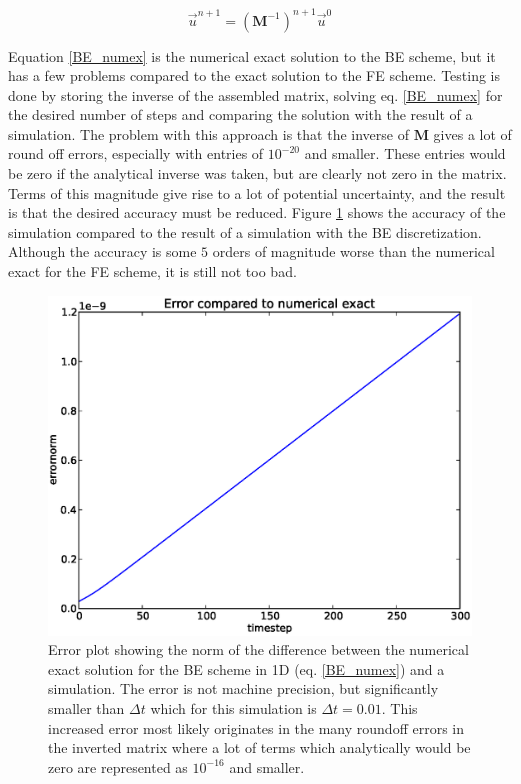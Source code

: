 \begin{equation}\label{BE_numex}
 \vec u^{n+1} = \left(\mathbf M^{-1}\right)^{n+1} \vec u^0
\end{equation}

Equation \eqref{BE_numex} is the numerical exact solution to the BE scheme, but it has a few problems compared to the exact solution to the FE scheme. 
Testing is done by storing the inverse of the assembled matrix, solving eq. \eqref{BE_numex} for the desired number of steps and comparing the solution with the result of a simulation. 
The problem with this approach is that the inverse of $\mathbf M$ gives a lot of round off errors, especially with entries of $10^{-20}$ and smaller. 
These entries would be zero if the analytical inverse was taken, but are clearly not zero in the matrix. 
Terms of this magnitude give rise to a lot of potential uncertainty, and the result is that the desired accuracy must be reduced. 
Figure \ref{numex:BE1D} shows the accuracy of the simulation compared to the result of a simulation with the BE discretization. 
Although the accuracy is some $5$ orders of magnitude worse than the numerical exact for the FE scheme, it is still not too bad. 

\begin{figure}[H]
 \centering
 \includegraphics[scale=0.7]{../doc/results/experiment_14042014_0759_BE1D_numerical_exact/results/numerical_exact.eps}
 \caption[Numerical exact errorplot for BE scheme]{Error plot showing the norm of the difference between the numerical exact solution for the BE scheme in 1D (eq. \ref{BE_numex}) and a simulation. 
 The error is not machine precision, but significantly smaller than $\Delta t$ which for this simulation is $\Delta t=0.01$. 
 This increased error most likely originates in the many roundoff errors in the inverted matrix where a lot of terms which analytically would be zero are represented as $10^{-16}$ and smaller.}
 \label{numex:BE1D}
\end{figure}




